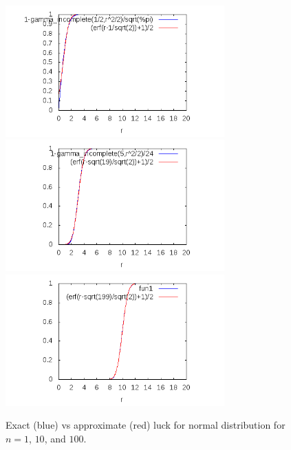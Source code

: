 \begin{figure}
  \caption{Exact (blue) vs approximate (red) luck for normal distribution for $n=1$, $10$, and $100$.}
  \centering
    \includegraphics[width=0.75\textwidth]{img/luck1}
    \includegraphics[width=0.75\textwidth]{img/luck10}
    \includegraphics[width=0.75\textwidth]{img/luck100}
\end{figure}

